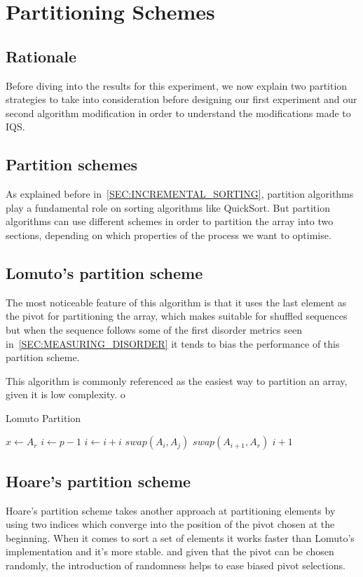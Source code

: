 \section{Partitioning Schemes}
\label{SECTION:PARTITIONING_SCHEMES}
\subsection{Rationale}
Before diving into the results for this experiment, we now explain two partition strategies to take into consideration before designing our first experiment and our second algorithm modification in order to understand the modifications made to IQS.

\subsection{Partition schemes}
As explained before in~\ref{SEC:INCREMENTAL_SORTING}, partition algorithms play a fundamental role on sorting algorithms like QuickSort. But partition algorithms can use different schemes in order to partition the array into two sections, depending on which properties of the process we want to optimise.

\subsection{Lomuto's partition scheme}

The most noticeable feature of this algorithm is that it uses the last element as the pivot for partitioning the array, which makes suitable for shuffled sequences but when the sequence follows some of the first disorder metrics seen in~\ref{SEC:MEASURING_DISORDER} it tends to bias the performance of this partition scheme.

This algorithm is commonly referenced as the easiest way to partition an array, given it is low complexity.
o
\begin{algorithm}
\caption{Lomuto Partition}\label{ALG:LOMUTO_PARTITION}
\begin{algorithmic}[1]
    \State $x \gets A_r$
    \State $i \gets p-1$
        \State $i \gets i + i$
        \State $swap(A_i, A_j)$
    \EndIf
    \EndFor
    \State $swap(A_{i+1}, A_r)$
    \State \Return $i + 1$
    \EndProcedure
\end{algorithmic}
\end{algorithm}

\subsection{Hoare's partition scheme}
Hoare's partition scheme takes another approach at partitioning elements by using two indices which converge into the position of the pivot chosen at the beginning. When it comes to sort a set of elements it works faster than Lomuto's implementation and it's more stable. and given that the pivot can be chosen randomly, the introduction of randomness helps to ease biased pivot selections.


